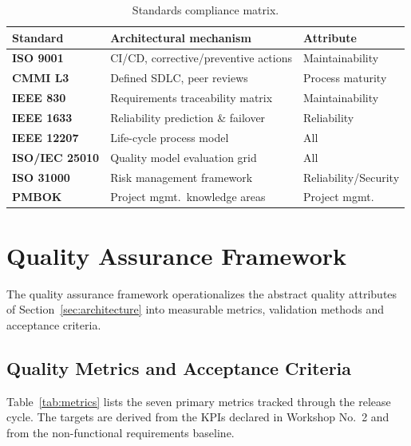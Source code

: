 \documentclass[conference,a4paper,10pt]{IEEEtran}
\begin{document}
\begin{table}[H]
\centering
\caption{Standards compliance matrix.}
\label{tab:standards}
\renewcommand{\arraystretch}{1.2}
\footnotesize
\begin{tabularx}{\columnwidth}{>{\bfseries}lXl}
\toprule
\rowcolor{tableheader} Standard & Architectural mechanism & Attribute \\
\midrule
ISO 9001 & CI/CD, corrective/preventive actions & Maintainability\\
CMMI L3 & Defined SDLC, peer reviews & Process maturity\\
IEEE 830 & Requirements traceability matrix & Maintainability\\
IEEE 1633 & Reliability prediction \& failover & Reliability\\
IEEE 12207 & Life-cycle process model & All\\
ISO/IEC 25010 & Quality model evaluation grid & All\\
ISO 31000 & Risk management framework & Reliability/Security\\
PMBOK & Project mgmt.\ knowledge areas & Project mgmt.\\
\bottomrule
\end{tabularx}
\end{table}

\section{Quality Assurance Framework}
\label{sec:quality}

The quality assurance framework operationalizes the abstract quality
attributes of Section~\ref{sec:architecture} into measurable metrics,
validation methods and acceptance criteria.

\subsection{Quality Metrics and Acceptance Criteria}

Table~\ref{tab:metrics} lists the seven primary metrics tracked through the
release cycle. The targets are derived from the KPIs declared in Workshop No.\
2 and from the non-functional requirements baseline.
\end{document}
